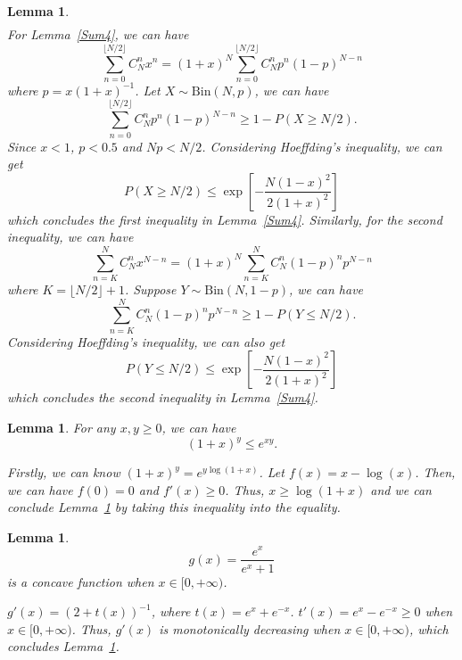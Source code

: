 \documentclass{article}
\makeatletter
\newcounter{lemmas}
\newtheorem{lemma}[lemmas]{Lemma}
\renewenvironment{proof}[1][\proofname]{\par
  \vspace{-\topsep}%
  \pushQED{\qed}%
  \normalfont
  \topsep0pt \partopsep0pt %
  \trivlist
  \item[\hskip\labelsep
        \itshape
    #1\@addpunct{.}]\ignorespaces
}{%
  \popQED\endtrivlist\@endpefalse
  \addvspace{0pt plus 0pt} %
}
\makeatother
\begin{document}
\begin{lemma}
\begin{proof}
\begin{equation}
\begin{split}
\end{split}
\end{equation}
For Lemma~\ref{Sum4}, we can have
\begin{equation}
\sum_{n=0}^{\lfloor N/2\rfloor} C_N^{n} x^{n}=(1+x)^{N}\sum_{n=0}^{\lfloor N/2\rfloor} C_N^{n} p^n (1-p)^{N-n}
\end{equation}
where $p=x(1+x)^{-1}$. Let $X\sim \mathrm{Bin}(N, p)$, we can have
\begin{equation}
\sum_{n=0}^{\lfloor N/2\rfloor} C_N^{n} p^n (1-p)^{N-n}\geq 1-P\left(X\geq N/2\right).
\end{equation}
Since $x<1$, $p<0.5$ and $Np<N/2$. Considering Hoeffding's inequality, we can get
\begin{equation}
P\left(X\geq N/2\right)\leq \exp \left[-\frac{N(1-x)^2}{2(1+x)^2}\right]
\end{equation}
which concludes the first inequality in Lemma~\ref{Sum4}. Similarly, for the second inequality, we can have
\begin{equation}
\sum_{n=K}^{N} C_N^{n}x^{N-n}=(1+x)^{N}\sum_{n=K}^{N} C_N^{n} (1-p)^n p^{N-n}
\end{equation}
where $K=\lfloor N/2 \rfloor +1$. Suppose $Y\sim \mathrm{Bin}(N, 1-p)$, we can have
\begin{equation}
\sum_{n=K}^{N} C_N^{n} (1-p)^n p^{N-n}\geq 1-P\left(Y\leq N/2\right).
\end{equation}
Considering Hoeffding's inequality, we can also get
\begin{equation}
P\left(Y\leq N/2\right)\leq \exp \left[-\frac{N(1-x)^2}{2(1+x)^2}\right]
\end{equation}
which concludes the second inequality in Lemma~\ref{Sum4}.
\end{proof}
\end{lemma}

\begin{lemma}
\label{Inequality1}
For any $x,y\geq 0$, we can have
$$(1+x)^{y}\leq e^{xy}.$$
\begin{proof}
Firstly, we can know $(1+x)^{y}=e^{y\log(1+x)}$. Let $f(x)=x-\log(x)$. Then, we can have $f(0)=0$ and $f'(x)\geq 0$. Thus, $x\geq\log (1+x)$ and we can conclude Lemma~\ref{Inequality1} by taking this inequality into the equality.
\end{proof}
\end{lemma}

\begin{lemma}
\label{Concave1}
$$g(x)=\frac{e^x}{e^x+1}$$
is a concave function when $x\in [0,+\infty)$.
\begin{proof}
$g'(x)= (2+t(x))^{-1}$, where $t(x)=e^x+e^{-x}$. $t'(x)=e^x-e^{-x}\geq 0$ when $x\in [0,+\infty)$. Thus, $g'(x)$ is monotonically decreasing when $x\in [0,+\infty)$, which concludes Lemma~\ref{Concave1}.
\end{proof}
\end{lemma}
\end{document}
